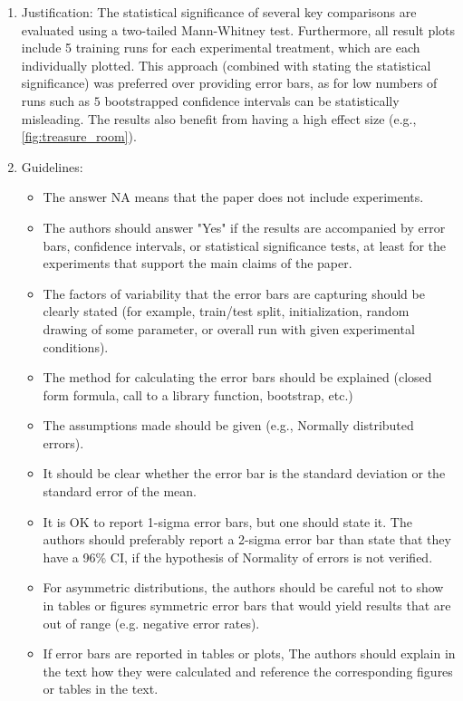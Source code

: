 \documentclass{article}
\begin{document}
\begin{enumerate}
    \answerYes{} %
    \item[] Justification: The statistical significance of several key comparisons are evaluated using a two-tailed Mann-Whitney test. Furthermore, all result plots include 5 training runs for each experimental treatment, which are each individually plotted. This approach (combined with stating the statistical significance) was preferred over providing error bars, as for low numbers of runs such as \(5\) bootstrapped confidence intervals can be statistically misleading. The results also benefit from having a high effect size (e.g., \ref{fig:treasure_room}).
    \item[] Guidelines:
    \begin{itemize}
        \item The answer NA means that the paper does not include experiments.
        \item The authors should answer "Yes" if the results are accompanied by error bars, confidence intervals, or statistical significance tests, at least for the experiments that support the main claims of the paper.
        \item The factors of variability that the error bars are capturing should be clearly stated (for example, train/test split, initialization, random drawing of some parameter, or overall run with given experimental conditions).
        \item The method for calculating the error bars should be explained (closed form formula, call to a library function, bootstrap, etc.)
        \item The assumptions made should be given (e.g., Normally distributed errors).
        \item It should be clear whether the error bar is the standard deviation or the standard error of the mean.
        \item It is OK to report 1-sigma error bars, but one should state it. The authors should preferably report a 2-sigma error bar than state that they have a 96\% CI, if the hypothesis of Normality of errors is not verified.
        \item For asymmetric distributions, the authors should be careful not to show in tables or figures symmetric error bars that would yield results that are out of range (e.g. negative error rates).
        \item If error bars are reported in tables or plots, The authors should explain in the text how they were calculated and reference the corresponding figures or tables in the text.
    \end{itemize}


\end{enumerate}
\end{document}
